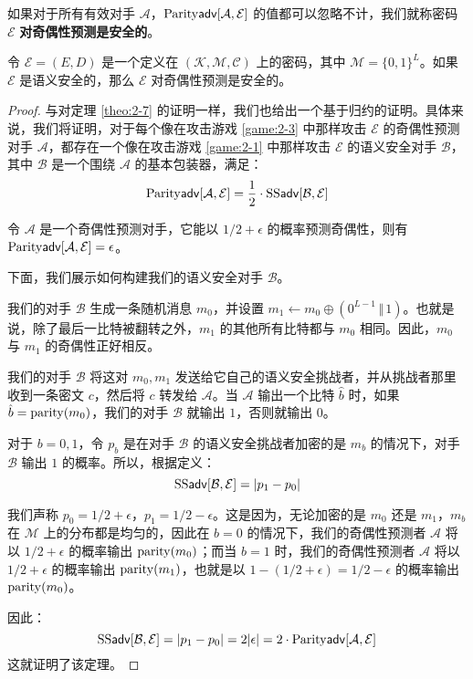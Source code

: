 \begin{definition}[奇偶性预测]
如果对于所有有效对手 $\mathcal{A}$，${\rm Parity\mathsf{adv}}[\mathcal{A},\mathcal{E}]$ 的值都可以忽略不计，我们就称密码 $\mathcal{E}$ \textbf{对奇偶性预测是安全的}。
\end{definition}

\begin{theorem}
令 $\mathcal{E}=(E,D)$ 是一个定义在 $(\mathcal{K},\mathcal{M},\mathcal{C})$ 上的密码，其中 $\mathcal{M}=\{0,1\}^L$。如果 $\mathcal{E}$ 是语义安全的，那么 $\mathcal{E}$ 对奇偶性预测是安全的。
\end{theorem}

\begin{proof}
与对定理 \ref{theo:2-7} 的证明一样，我们也给出一个基于归约的证明。具体来说，我们将证明，对于每个像在攻击游戏 \ref{game:2-3} 中那样攻击 $\mathcal{E}$ 的奇偶性预测对手 $\mathcal{A}$，都存在一个像在攻击游戏 \ref{game:2-1} 中那样攻击 $\mathcal{E}$ 的语义安全对手 $\mathcal{B}$，其中 $\mathcal{B}$ 是一个围绕 $\mathcal{A}$ 的基本包装器，满足：
\[
{\rm Parity\mathsf{adv}}[\mathcal{A},\mathcal{E}]
=
\frac{1}{2}\cdot
{\rm SS\mathsf{adv}}[\mathcal{B},\mathcal{E}]
\]

令 $\mathcal{A}$ 是一个奇偶性预测对手，它能以 $1/2+\epsilon$ 的概率预测奇偶性，则有 ${\rm Parity\mathsf{adv}}[\mathcal{A},\mathcal{E}]=\epsilon$。

下面，我们展示如何构建我们的语义安全对手 $\mathcal{B}$。

我们的对手 $\mathcal{B}$ 生成一条随机消息 $m_0$，并设置 $m_1\leftarrow m_0\oplus(0^{L-1}\,\Vert\,1)$。也就是说，除了最后一比特被翻转之外，$m_1$ 的其他所有比特都与 $m_0$ 相同。因此，$m_0$ 与 $m_1$ 的奇偶性正好相反。

我们的对手 $\mathcal{B}$ 将这对 $m_0,m_1$ 发送给它自己的语义安全挑战者，并从挑战者那里收到一条密文 $c$，然后将 $c$ 转发给 $\mathcal{A}$。当 $\mathcal{A}$ 输出一个比特 $\hat b$ 时，如果 $\hat b={\rm parity}(m_0)$，我们的对手 $\mathcal{B}$ 就输出 $1$，否则就输出 $0$。

对于 $b=0,1$，令 $p_b$ 是在对手 $\mathcal{B}$ 的语义安全挑战者加密的是 $m_b$ 的情况下，对手 $\mathcal{B}$ 输出 $1$ 的概率。所以，根据定义：
\[
{\rm SS\mathsf{adv}}[\mathcal{B},\mathcal{E}]=|p_1-p_0|
\]

我们声称 $p_0={1}/{2}+\epsilon$，$p_1={1}/{2}-\epsilon$。这是因为，无论加密的是 $m_0$ 还是 $m_1$，$m_b$ 在 $\mathcal{M}$ 上的分布都是均匀的，因此在 $b=0$ 的情况下，我们的奇偶性预测者 $\mathcal{A}$ 将以 ${1}/{2}+\epsilon$ 的概率输出 ${\rm parity}(m_0)$；而当 $b=1$ 时，我们的奇偶性预测者 $\mathcal{A}$ 将以 ${1}/{2}+\epsilon$ 的概率输出 ${\rm parity}(m_1)$，也就是以 $1-({1}/{2}+\epsilon)={1}/{2}-\epsilon$ 的概率输出 ${\rm parity}(m_0)$。

因此：
\[
{\rm SS\mathsf{adv}}[\mathcal{B},\mathcal{E}]=|p_1-p_0|=2|\epsilon|=2\cdot{\rm Parity\mathsf{adv}}[\mathcal{A},\mathcal{E}]
\]
这就证明了该定理。
\end{proof}

